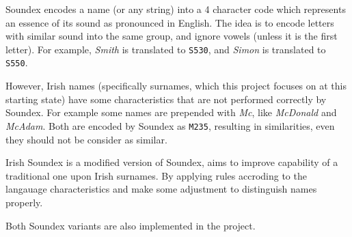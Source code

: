 Soundex \cite{soundex} encodes a name (or any string) into a 4 character code
which represents an essence of its sound as pronounced in English.
The idea is to encode letters with similar sound into the same group,
and ignore vowels (unless it is the first letter).
For example, \emph{Smith} is translated to \texttt{S530}, and
\emph{Simon} is translated to \texttt{S550}.





However, Irish names (specifically surnames, which this project
focuses on at this starting state) have some characteristics
that are not performed correctly by Soundex. For example
some names are prepended with \emph{Mc}, like \emph{McDonald} and
\emph{McAdam}. Both are encoded by Soundex as \texttt{M235},
resulting in similarities, even they should not be consider as similar.

Irish Soundex \cite{adamw} is a modified version of Soundex,
aims to improve capability of a traditional one upon Irish surnames.
By applying rules accroding to the langauage characteristics and
make some adjustment to distinguish names properly.

Both Soundex variants are also implemented in the project.


